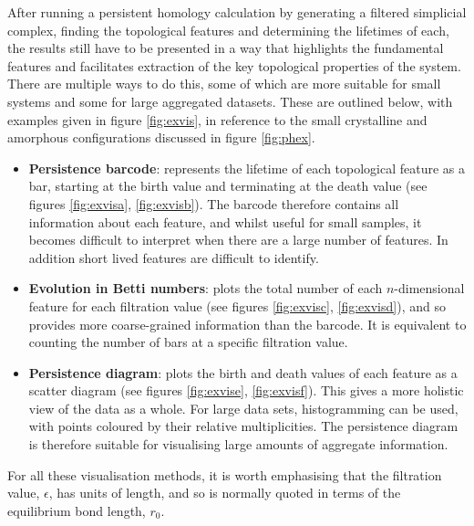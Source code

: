 After running a persistent homology calculation by generating a filtered simplicial complex, finding the topological features and determining the lifetimes of each, the results still have to be presented in a way that highlights the fundamental features and facilitates extraction of the key topological properties of the system.
There are multiple ways to do this, some of which are more suitable for small systems and some for large aggregated datasets.
These are outlined below, with examples given in figure \ref{fig:exvis}, in reference to the small crystalline and amorphous configurations discussed in figure \ref{fig:phex}.
\begin{itemize}
	\item \textbf{Persistence barcode}: represents the lifetime of each topological feature as a bar, starting at the birth value and terminating at the death value (see figures \ref{fig:exvisa}, \ref{fig:exvisb}). The barcode therefore contains all information about each feature, and whilst useful for small samples, it becomes difficult to interpret when there are a large number of features. In addition short lived features are difficult to identify.
	
	\item \textbf{Evolution in Betti numbers}: plots the total number of each $n$\--dimensional feature for each filtration value (see figures \ref{fig:exvisc}, \ref{fig:exvisd}), and so provides more coarse\--grained information than the barcode. It is equivalent to counting the number of bars at a specific filtration value.
	
	\item \textbf{Persistence diagram}: plots the birth and death values of each feature as a scatter diagram (see figures \ref{fig:exvise}, \ref{fig:exvisf}). This gives a more holistic view of the data as a whole. For large data sets, histogramming can be used, with points coloured by their relative multiplicities. The persistence diagram is therefore suitable for visualising large amounts of aggregate information.
	
\end{itemize}
For all these visualisation methods, it is worth emphasising that the filtration value, $\epsilon$, has units of length, and so is normally quoted in terms of the equilibrium bond length, $r_0$. 

